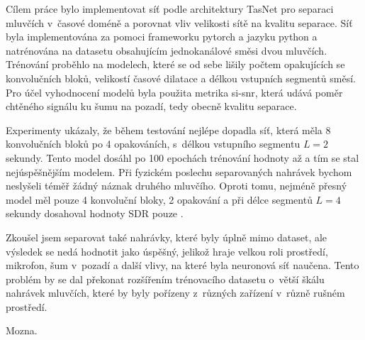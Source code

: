 Cílem práce bylo implementovat síť podle architektury TasNet pro separaci mluvčích v~časové doméně a porovnat vliv velikosti sítě na kvalitu separace. Síť byla implementována za pomoci frameworku pytorch a jazyku python a natrénována na datasetu obsahujícím jednokanálové směsi dvou mluvčích. Trénování proběhlo na  modelech, které se od sebe lišily počtem opakujících se konvolučních bloků, velikostí časové dilatace a délkou vstupních segmentů směsí. Pro účel vyhodnocení modelů byla použita metrika si-snr, která udává poměr chtěného signálu ku šumu na pozadí, tedy obecně kvalitu separace. 

Experimenty ukázaly, že během testování nejlépe dopadla síť, která měla 8 konvolučních bloků po 4 opakováních, s~délkou vstupního segmentu $L=2$ sekundy. Tento model dosáhl po 100 epochách trénování hodnoty až  a tím se stal nejúspěšnějším modelem. Při fyzickém poslechu separovaných nahrávek bychom neslyšeli téměř žádný náznak druhého mluvčího. Oproti tomu, nejméně přesný model měl pouze 4 konvoluční bloky, 2 opakování a při délce segmentů $L=4$ sekundy dosahoval hodnoty SDR pouze .

Zkoušel jsem separovat také nahrávky, které byly úplně mimo dataset, ale výsledek se nedá hodnotit jako úspěšný, jelikož hraje velkou roli prostředí, mikrofon, šum v~pozadí a další vlivy, na které byla neuronová síť naučena. Tento problém by se dal překonat rozšířením trénovacího datasetu o~větší škálu nahrávek mluvčích, které by byly pořízeny z~různých zařízení v~různě rušném prostředí.

Mozna.


